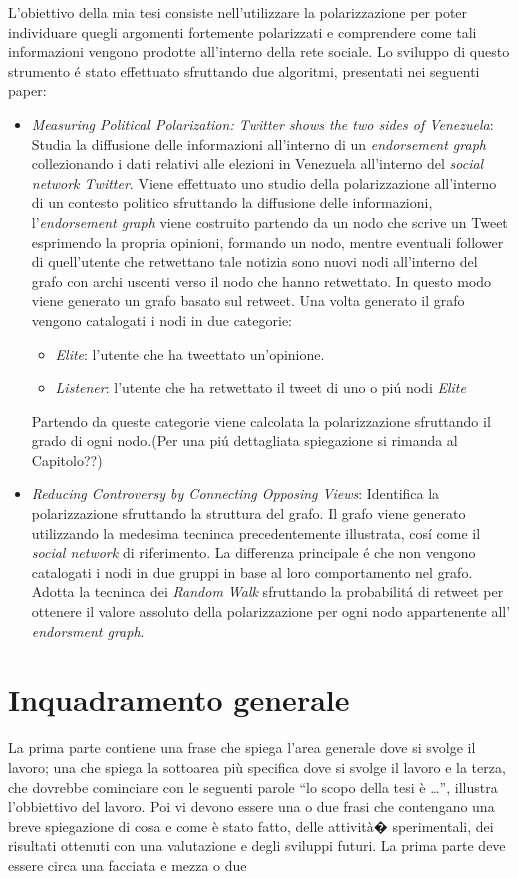 L'obiettivo della mia tesi consiste nell'utilizzare la polarizzazione per poter individuare quegli argomenti fortemente polarizzati e comprendere come tali informazioni vengono prodotte all'interno della rete sociale.
Lo sviluppo di questo strumento \'e stato effettuato sfruttando due algoritmi, presentati nei seguenti paper:
\begin{itemize}
\item \textit{Measuring Political Polarization: Twitter shows the two sides of Venezuela}:
Studia la diffusione delle informazioni all'interno di un \textit{endorsement graph} collezionando i dati relativi alle elezioni in Venezuela all'interno del \textit{social network Twitter}. Viene effettuato uno studio della polarizzazione all'interno di un contesto politico sfruttando la diffusione delle informazioni, l'\textit{endorsement graph} viene costruito partendo da un nodo che scrive un Tweet esprimendo la propria opinioni, formando un nodo, mentre eventuali follower di quell'utente che retwettano tale notizia sono nuovi nodi all'interno del grafo con archi uscenti verso il nodo che hanno retwettato. In questo modo viene generato un grafo basato sul retweet.
Una volta generato il grafo vengono catalogati i nodi in due categorie:
\begin{itemize}
\item \textit{Elite}: l'utente che ha tweettato un'opinione.
\item \textit{Listener}: l'utente che ha retwettato il tweet di uno o pi\'u nodi \textit{Elite}
\end{itemize}
Partendo da queste categorie viene calcolata la polarizzazione sfruttando il grado di ogni nodo.(Per una pi\'u dettagliata spiegazione si rimanda al Capitolo??)

\item \textit{Reducing Controversy by Connecting Opposing Views}:
Identifica la polarizzazione sfruttando la struttura del grafo. Il grafo viene generato utilizzando la medesima tecninca precedentemente illustrata, cos\'i come il \textit{social network} di riferimento. La differenza principale \'e che non vengono catalogati i nodi in due gruppi in base al loro comportamento nel grafo. Adotta la tecninca dei \textit{Random Walk} sfruttando la probabilit\'a di retweet per ottenere il valore assoluto della polarizzazione per ogni nodo appartenente all' \textit{endorsment graph}.
\end{itemize}


\section{Inquadramento generale}
La prima parte contiene una frase che spiega l'area generale dove si svolge il lavoro; una che spiega la sottoarea pi\`u specifica dove si svolge il lavoro e la terza, che dovrebbe cominciare con le seguenti parole ``lo scopo della tesi \`e \dots'', illustra l'obbiettivo del lavoro. Poi vi devono essere una o due frasi che contengano una breve spiegazione di cosa e come \`e stato fatto, delle attivit\`a� sperimentali, dei risultati ottenuti con una valutazione e degli sviluppi futuri. La prima parte deve essere circa una facciata e mezza o due

